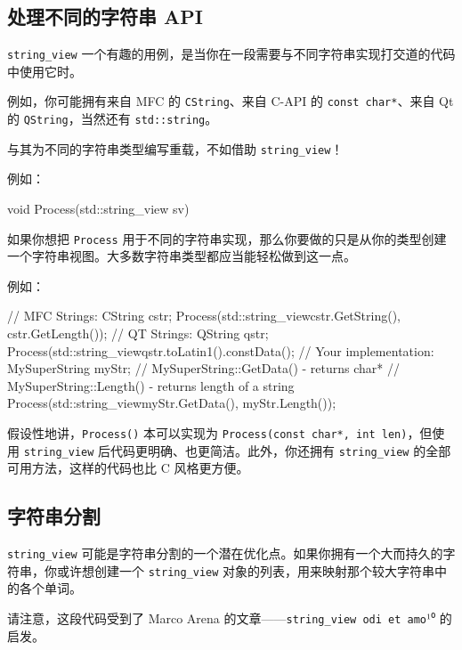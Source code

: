 \subsection{处理不同的字符串 API}

\texttt{string\_view} 一个有趣的用例，是当你在一段需要与不同字符串实现打交道的代码中使用它时。

例如，你可能拥有来自 MFC 的 \texttt{CString}、来自 C-API 的 \texttt{const char*}、来自 Qt 的 \texttt{QString}，当然还有 \texttt{std::string}。

与其为不同的字符串类型编写重载，不如借助 \texttt{string\_view}！

例如：

\begin{codebox}[cpp]
void Process(std::string_view sv) { }
\end{codebox}

如果你想把 \texttt{Process} 用于不同的字符串实现，那么你要做的只是从你的类型创建一个字符串视图。大多数字符串类型都应当能轻松做到这一点。

例如：

\begin{codebox}[cpp]
// MFC Strings:
CString cstr;
Process(std::string_view{cstr.GetString(), cstr.GetLength()});
// QT Strings:
QString qstr;
Process(std::string_view{qstr.toLatin1().constData()};
// Your implementation:
MySuperString myStr;
// MySuperString::GetData() - returns char*
// MySuperString::Length() - returns length of a string
Process(std::string_view{myStr.GetData(), myStr.Length()});
\end{codebox}

假设性地讲，\texttt{Process()} 本可以实现为 \texttt{Process(const char*, int len)}，但使用 \texttt{string\_view} 后代码更明确、也更简洁。此外，你还拥有 \texttt{string\_view} 的全部可用方法，这样的代码也比 C 风格更方便。

\subsection{字符串分割}

\texttt{string\_view} 可能是字符串分割的一个潜在优化点。如果你拥有一个大而持久的字符串，你或许想创建一个 \texttt{string\_view} 对象的列表，用来映射那个较大字符串中的各个单词。

请注意，这段代码受到了 Marco Arena 的文章——\texttt{string\_view odi et amo}¹⁰ 的启发。


